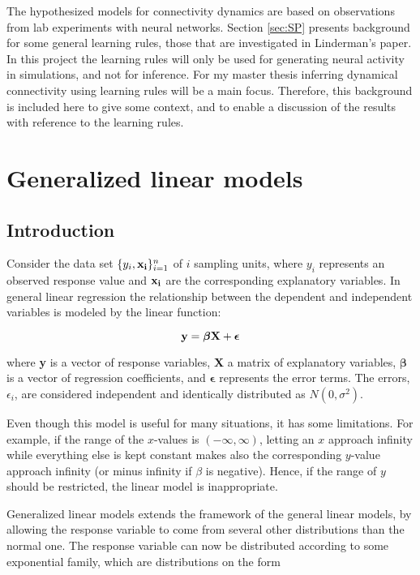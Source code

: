 The hypothesized models for connectivity dynamics are based on observations from lab experiments with neural networks. Section \ref{sec:SP} presents background for some general learning rules, those that are investigated in Linderman's paper. In this project the learning rules will only be used for generating neural activity in simulations, and not for inference. For my master thesis inferring dynamical connectivity using learning rules will be a main focus. Therefore, this background is included here to give some context, and to enable a discussion of the results with reference to the learning rules.

\section{Generalized linear models}
\label{sec:stats}

\subsection{Introduction}
\label{Intro_GLM}
Consider the data set $ \{y_{i}, \bold{x_{i}}\}_{i=1}^{n} $ of $i$ sampling units, where $y_i$ represents an observed response value and $ \bold{x_i}$ are the corresponding explanatory variables. In general linear regression the relationship between the dependent and independent variables is modeled by the linear function:

\begin{equation}
\label{eq:general}
    \textbf{y} = \bm{ \beta}\bf X + \bm{ \epsilon}
\end{equation}

where \textbf{y} is a vector of response variables, \textbf{X} a matrix of explanatory variables, $\bm{\beta}$ is a vector of regression coefficients, and $\bm{ \epsilon}$ represents the error terms. The errors, $\epsilon_{i}$, are considered independent and identically distributed as $N(0, \sigma^{2})$.

Even though this model is useful for many situations, it has some limitations. For example, if the range of the $x$-values is $(-\infty, \infty)$, letting an $x$ approach infinity while everything else is kept constant makes also the corresponding $y$-value approach infinity (or minus infinity if $\beta$ is negative). Hence, if the range of $y$ should be restricted, the linear model is inappropriate. 

Generalized linear models extends the framework of the general linear models, by allowing the response variable to come from several other distributions than the normal one. The response variable can now be distributed according to some exponential family, which are distributions on the form

